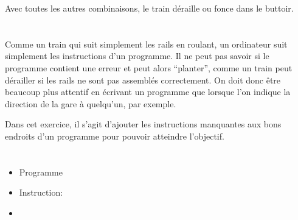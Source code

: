{{Avec toutes les autres combinaisons, le train déraille ou fonce dans le buttoir.



\section*{\BrochureItsInformatics}
Comme un train qui suit simplement les rails en roulant, un ordinateur suit simplement les instructions d’un programme. Il ne peut pas savoir si le programme contient une erreur et peut alors “planter”, comme un train peut dérailler si les rails ne sont pas assemblés correctement. On doit donc être beaucoup plus attentif en écrivant un programme que lorsque l’on indique la direction de la gare à quelqu’un, par exemple.

Dans cet exercice, il s’agit d’ajouter les instructions manquantes aux bons endroits d’un programme pour pouvoir atteindre l’objectif.



\section*{\BrochureWebsitesAndKeywords}
{\raggedright
\begin{itemize}
  \item Programme
  \item Instruction: \href{https://fr.wikipedia.org/wiki/Instruction_informatique}{}
  \item \href{https://fr.wikipedia.org/wiki/Algorithme}{}
\end{itemize}


}

}{}

\def\AuthorRibeiroP{} %
\def\AuthorParriauxG{} %
\def\AuthorWeigendM{} %
\def\AuthorKinciusV{} %
\def\AuthorRossmanithP{} %
\def\AuthorDatzkoS{} %
\def\AuthorPelletE{} %

\newpage}{}
